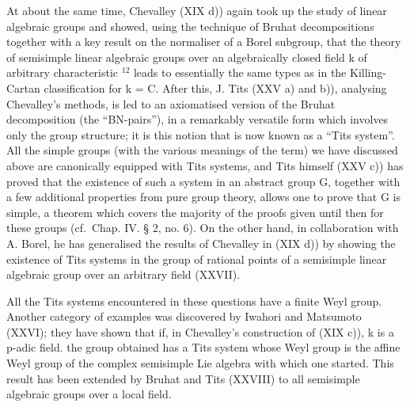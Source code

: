 At about the same time, Chevalley (XIX d)) again took up the study of linear algebraic groups and showed, using the technique of Bruhat decompositions together with a key result on the normaliser of a Borel subgroup, that the theory of semisimple linear algebraic groups over an algebraically closed field k of arbitrary characteristic \(^{12}\) leads to essentially the same types as in the Killing-Cartan classification for k = C. After this, J. Tits (XXV a) and b)), analysing Chevalley's methods, is led to an axiomatised version of the Bruhat decomposition (the ``BN-pairs''), in a remarkably versatile form which involves only the group structure; it is this notion that is now known as a ``Tits system''. All the simple groups (with the various meanings of the term) we have discussed above are canonically equipped with Tits systems, and Tits himself (XXV c)) has proved that the existence of such a system in an abstract group G, together with a few additional properties from pure group theory, allows one to prove that G is simple, a theorem which covers the majority of the proofs given until then for these groups (cf.~Chap. IV. § 2, no. 6). On the other hand, in collaboration with A. Borel, he has generalised the results of Chevalley in (XIX d)) by showing the existence of Tits systems in the group of rational points of a semisimple linear algebraic group over an arbitrary field (XXVII).

All the Tits systems encountered in these questions have a finite Weyl group. Another category of examples was discovered by Iwahori and Matsumoto (XXVI); they have shown that if, in Chevalley's construction of (XIX c)), k is a p-adic field. the group obtained has a Tits system whose Weyl group is the affine Weyl group of the complex semisimple Lie algebra with which one started. This result has been extended by Bruhat and Tits (XXVIII) to all semisimple algebraic groups over a local field.


